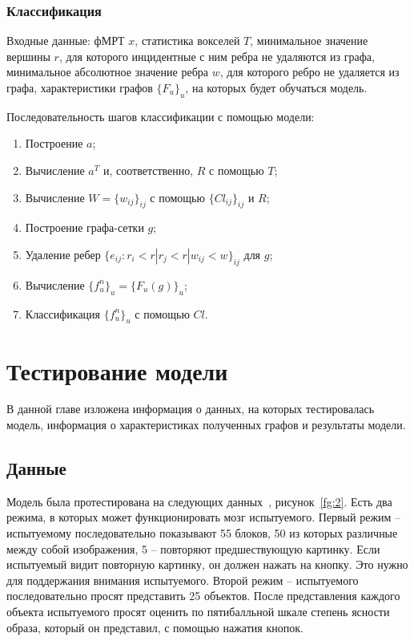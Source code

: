 \documentclass[specialist,
substylefile = spbu_report.rtx,
subf,href,colorlinks=true, 12pt]{disser}
\begin{document}
			\subsection{Классификация}
				Входные данные: фМРТ $x$, статистика вокселей $T$, минимальное значение вершины $r$, для которого инцидентные с ним ребра не удаляются из графа, минимальное абсолютное значение ребра $w$, для которого ребро не удаляется из графа, характеристики графов $\{F_u\}_u$, на которых будет обучаться модель.
				
				Последовательность шагов классификации с помощью модели:				
				\begin{enumerate}
					\item Построение $a$;
					\item Вычисление $a^{T}$ и, соответственно, $R$ с помощью $T$;
					\item Вычисление $W = \{w_{ij}\}_{ij}$ с помощью $\{Cl_{ij}\}_{ij}$ и $R$;
					\item Построение графа-сетки $g$;
					\item Удаление ребер $\{e_{ij} : r_i < r | r_j < r | w_{ij} < w\}_{ij}$  для $g$;
					\item Вычисление $\{f^n_u\}_u = \{F_u(g)\}_u$;
					\item Классификация $\{f^n_u\}_u$ с помощью $Cl$.
				\end{enumerate}

	\chapter{Тестирование модели}	
		В данной главе изложена информация о данных, на которых тестировалась модель, информация о характеристиках полученных графов и результаты модели.
		
		\section{Данные}	
			Модель была протестирована на следующих данных~\cite{Horikawa2019}, рисунок~\ref{fg:2}. Есть два режима, в которых может функционировать мозг испытуемого. Первый режим – испытуемому последовательно показывают 55 блоков, 50 из которых различные между собой изображения, 5 – повторяют предшествующую картинку. Если испытуемый видит повторную картинку, он должен нажать на кнопку. Это нужно для поддержания внимания испытуемого. Второй режим – испытуемого последовательно просят представить 25 объектов. После представления каждого объекта испытуемого просят оценить по пятибалльной шкале степень ясности образа, который он представил, с помощью нажатия кнопок.
			
\end{document}
